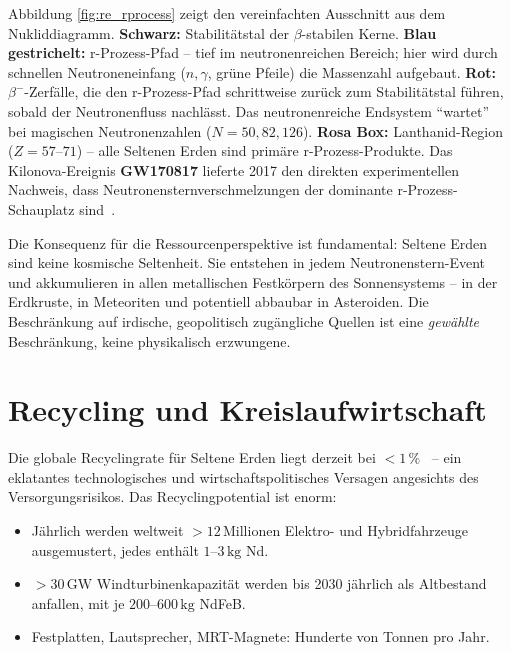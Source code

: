 ﻿\documentclass[12pt, a4paper]{report}
\theoremstyle{definition}
\theoremstyle{remark}
\begin{document}
Abbildung \ref{fig:re_rprocess} zeigt den vereinfachten Ausschnitt aus dem Nukliddiagramm. \textbf{Schwarz:} Stabilitätstal der $\beta$-stabilen Kerne.
\textbf{Blau gestrichelt:} r-Prozess-Pfad -- tief im neutronenreichen
Bereich; hier wird durch schnellen Neutroneneinfang ($n, \gamma$, grüne
Pfeile) die Massenzahl aufgebaut.
\textbf{Rot:} $\beta^-$-Zerfälle, die den r-Prozess-Pfad schrittweise
zurück zum Stabilitätstal führen, sobald der Neutronenfluss nachlässt.
Das neutronenreiche Endsystem ``wartet'' bei magischen Neutronenzahlen
($N = 50, 82, 126$). \textbf{Rosa Box:} Lanthanid-Region ($Z = 57$--$71$) --
alle Seltenen Erden sind primäre r-Prozess-Produkte.
Das Kilonova-Ereignis \textbf{GW170817} lieferte 2017 den direkten
experimentellen Nachweis, dass Neutronensternverschmelzungen der
dominante r-Prozess-Schauplatz sind~\cite{abbott2016,smartt2017}.

Die Konsequenz für die Ressourcenperspektive ist fundamental: Seltene Erden
sind keine kosmische Seltenheit. Sie entstehen in jedem Neutronenstern-Event
und akkumulieren in allen metallischen Festkörpern des Sonnensystems -- in
der Erdkruste, in Meteoriten und potentiell abbaubar in Asteroiden. Die
Beschränkung auf irdische, geopolitisch zugängliche Quellen ist eine
\emph{gewählte} Beschränkung, keine physikalisch erzwungene.

\section{Recycling und Kreislaufwirtschaft}
\label{ssec:re_recycling}

Die globale Recyclingrate für Seltene Erden liegt derzeit bei $< 1\,\%$~\cite{weng2015}
-- ein eklatantes technologisches und wirtschaftspolitisches Versagen angesichts
des Versorgungsrisikos. Das Recyclingpotential ist enorm:
\begin{itemize}
  \item Jährlich werden weltweit $>12\,\text{Millionen}$ Elektro- und
        Hybridfahrzeuge ausgemustert, jedes enthält $1$--$3\,\text{kg}$ Nd.
  \item $>30\,\text{GW}$ Windturbinenkapazität werden bis 2030 jährlich als
        Altbestand anfallen, mit je $200$--$600\,\text{kg}$ NdFeB.
  \item Festplatten, Lautsprecher, MRT-Magnete: Hunderte von Tonnen pro Jahr.
\end{itemize}
\end{document}
